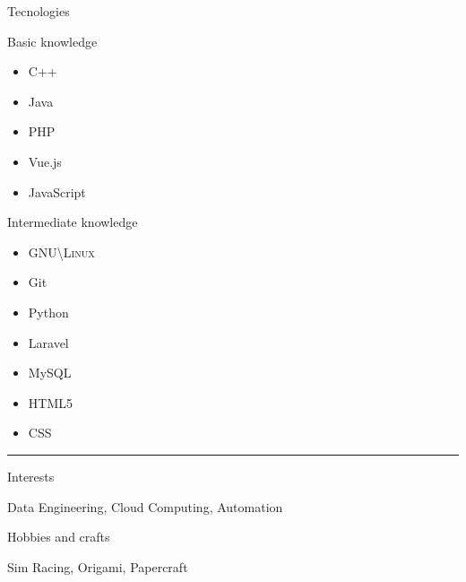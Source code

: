 \documentclass[a4paper,10pt]{article}
\newlength{\cvcolumngapwidth}
\newlength{\cvleftcolumnwidth}
\newlength{\cvrightcolumnwidth}
\newcommand{\cvsectionstyle}[1]{{\normalsize\cvsectionfont\textcolor{cvsectioncolor}{#1}}}
\newcommand{\cvheadingstyle}[1]{{\normalsize\cvheadingfont\textcolor{cvheadingcolor}{#1}}}
\newlength{\cvafteritemskipamount}
\newlength{\cvaftersectionskipamount}
\newlength{\cvbetweensectionandheadingextraskipamount}
\newlength{\cvparskip}
\newcommand{\cvsection}[1]{
    \begin{minipage}[t]{\cvleftcolumnwidth}
        \raggedleft\cvsectionstyle{#1}
    \end{minipage}%
    \hspace{\cvcolumngapwidth}%
    \begin{minipage}[t]{\cvrightcolumnwidth}
        \textcolor{cvrulecolor}{\rule{\cvrightcolumnwidth}{0.3mm}}
    \end{minipage}

    \vspace{\cvaftersectionskipamount}
}
\newcommand{\cvitem}[2]{
    \begin{minipage}[t]{\cvleftcolumnwidth}
        \raggedleft #1
    \end{minipage}%
    \hspace{\cvcolumngapwidth}%
    \begin{minipage}[t]{\cvrightcolumnwidth}
        \setlength{\parskip}{\cvparskip} #2
    \end{minipage}

    \vspace{\cvafteritemskipamount}
}
\begin{document}
\cvitem{
    \cvheadingstyle{Tecnologies}
}{
    Basic knowledge
    \vspace{-3mm}
    \begin{multicols}{2}
        \begin{itemize}
            \item C++
            \item Java
            \item PHP
            \item Vue.js
            \item JavaScript
        \end{itemize}
    \end{multicols}
    \vspace{-3mm}

    Intermediate knowledge
    \vspace{-3mm}
    \begin{multicols}{2}
        \begin{itemize}
            \item \textsc{GNU\textbackslash Linux}
            \item Git
            \item Python
            \item Laravel
            \item MySQL
            \item HTML5
            \item CSS
        \end{itemize}{}
    \end{multicols}
    \vspace{-3mm}
}


\cvsection{ADDITIONAL INFORMATION}

\vspace{\cvbetweensectionandheadingextraskipamount}

\cvitem{
    \cvheadingstyle{Interests}
}{
    Data Engineering, Cloud Computing, Automation
}

\cvitem{
    \cvheadingstyle{Hobbies and crafts}
}{
    Sim Racing, Origami, Papercraft
}
\end{document}
